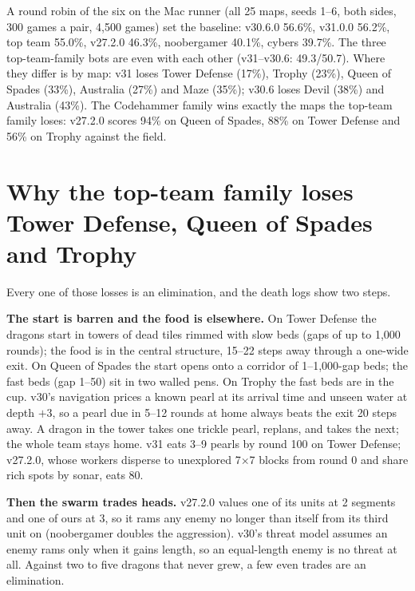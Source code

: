 \documentclass[11pt,a4paper]{article}
\begin{document}
A round robin of the six on the Mac runner (all 25 maps, seeds 1--6, both sides, 300 games a pair, 4,500 games) set the
baseline: v30.6.0 56.6\%, v31.0.0 56.2\%, top team 55.0\%, v27.2.0 46.3\%, noobergamer 40.1\%, cybers 39.7\%. The three
top-team-family bots are even with each other (v31--v30.6: 49.3/50.7). Where they differ is by map: v31 loses Tower
Defense (17\%), Trophy (23\%), Queen of Spades (33\%), Australia (27\%) and Maze (35\%); v30.6 loses Devil (38\%) and
Australia (43\%). The Codehammer family wins exactly the maps the top-team family loses: v27.2.0 scores 94\% on Queen of
Spades, 88\% on Tower Defense and 56\% on Trophy against the field.

\section{Why the top-team family loses Tower Defense, Queen of Spades and Trophy}
Every one of those losses is an elimination, and the death logs show two steps.

\textbf{The start is barren and the food is elsewhere.} On Tower Defense the dragons start in towers of dead tiles
rimmed with slow beds (gaps of up to 1,000 rounds); the food is in the central structure, 15--22 steps away through a
one-wide exit. On Queen of Spades the start opens onto a corridor of 1--1,000-gap beds; the fast beds (gap 1--50) sit in
two walled pens. On Trophy the fast beds are in the cup. v30's navigation prices a known pearl at its arrival time and
unseen water at depth $+3$, so a pearl due in 5--12 rounds at home always beats the exit 20 steps away. A dragon in the
tower takes one trickle pearl, replans, and takes the next; the whole team stays home. v31 eats 3--9 pearls by round 100
on Tower Defense; v27.2.0, whose workers disperse to unexplored 7$\times$7 blocks from round 0 and share rich spots by
sonar, eats 80.

\textbf{Then the swarm trades heads.} v27.2.0 values one of its units at 2 segments and one of ours at 3, so it rams any
enemy no longer than itself from its third unit on (noobergamer doubles the aggression). v30's threat model assumes an
enemy rams only when it gains length, so an equal-length enemy is no threat at all. Against two to five dragons that
never grew, a few even trades are an elimination.
\end{document}
